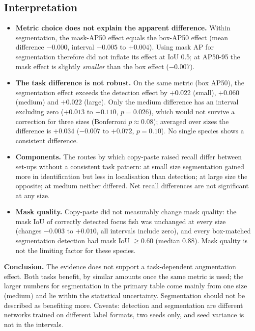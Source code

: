 \documentclass[11pt,a4paper]{article}
\begin{document}
\subsection*{Interpretation}
\begin{itemize}
\item \textbf{Metric choice does not explain the apparent difference.} Within segmentation, the mask-AP50 effect equals the box-AP50
effect (mean difference $-0.000$, interval $-0.005$ to $+0.004$). Using mask AP for segmentation therefore did not inflate its
effect at IoU 0.5; at AP50-95 the mask effect is slightly \emph{smaller} than the box effect ($-0.007$).
\item \textbf{The task difference is not robust.} On the same metric (box AP50), the segmentation effect exceeds the detection
effect by $+0.022$ (small), $+0.060$ (medium) and $+0.022$ (large). Only the medium difference has an interval excluding zero
($+0.013$ to $+0.110$, $p=0.026$), which would not survive a correction for three sizes (Bonferroni $p\approx0.08$); averaged over sizes
the difference is $+0.034$ ($-0.007$ to $+0.072$, $p=0.10$). No single species shows a consistent difference.
\item \textbf{Components.} The routes by which copy-paste raised recall differ between set-ups without a consistent task pattern:
at small size segmentation gained more in identification but less in localisation than detection; at large size the opposite;
at medium neither differed. Net recall differences are not significant at any size.
\item \textbf{Mask quality.} Copy-paste did not measurably change mask quality: the mask IoU of correctly detected focus fish was
unchanged at every size (changes $-0.003$ to $+0.010$, all intervals include zero), and every box-matched segmentation detection had
mask IoU $\geq 0.60$ (median 0.88). Mask quality is not the limiting factor for these species.
\end{itemize}
\textbf{Conclusion.} The evidence does not support a task-dependent augmentation effect. Both tasks benefit, by similar amounts once
the same metric is used; the larger numbers for segmentation in the primary table come mainly from one size (medium) and lie within
the statistical uncertainty. Segmentation should not be described as benefiting more. Caveats: detection and segmentation are
different networks trained on different label formats, two seeds only, and seed variance is not in the intervals.
\end{document}
